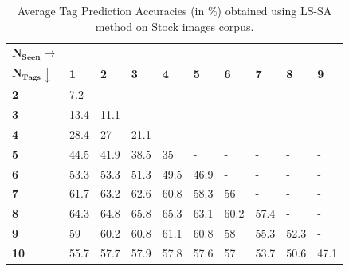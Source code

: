 \begin{table}[!htp]
\fontsize{8pt}{1em}\selectfont
\begin{center}
\caption{Average Tag Prediction Accuracies (in \%) obtained using LS-SA method on Stock images corpus.}
\label{tab:TPGWS30LSSA}
\begin{tabular}{|p{1.5cm}|p{0.5cm}|p{0.5cm}|p{0.5cm}|p{0.5cm}|p{0.5cm}|p{0.5cm}|p{0.5cm}|p{0.5cm}|p{0.5cm}|}
		\hline
		{$\boldsymbol{N_{Seen} \rightarrow}$} & &  &  &  & &  &  &  &\\ 
		{$\boldsymbol{N_{Tags}}\downarrow $} & \textbf{1} & \textbf{2} & \textbf{3} & \textbf{4} & \textbf{5}  & \textbf{6} & \textbf{7} & \textbf{8} & \textbf{9} \\ 
		\hline 		
		\textbf{2} & 7.2&-&-&-&-&-&-&-&- \\
		\hline
		\textbf{3} & 13.4&11.1&-&-&-&-&-&-&- \\ 
		\hline
		\textbf{4} & 28.4&27&21.1&-&-&-&-&-&- \\
		\hline
		\textbf{5} & 44.5&41.9&38.5&35&-&-&-&-&- \\
		\hline
		\textbf{6} & 53.3&53.3&51.3&49.5&46.9&-&-&-&- \\
		\hline
		\textbf{7} & 61.7&63.2&62.6&60.8&58.3&56&-&-&- \\
		\hline
		\textbf{8} & 64.3&64.8&65.8&65.3&63.1&60.2&57.4&-&- \\
		\hline
		\textbf{9} & 59&60.2&60.8&61.1&60.8&58&55.3&52.3&- \\
		\hline
		\textbf{10} & 55.7&57.7&57.9&57.8&57.6&57&53.7&50.6&47.1 \\
		\hline
\end{tabular}
\vspace{-2.5mm}
\end{center}
\end{table}

